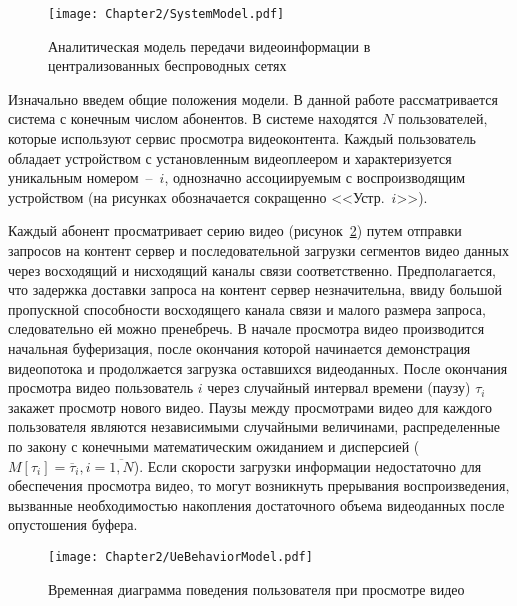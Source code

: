 \begin{figure}[htbp]
\begin{center}
\texttt{[image: Chapter2/SystemModel.pdf]}
\caption{Аналитическая модель передачи видеоинформации в централизованных беспроводных сетях}
\label{fig:SystemModel}
\end{center}
\end{figure}

Изначально введем общие положения модели. В данной работе рассматривается система с конечным числом абонентов. В системе находятся $N$ пользователей, которые используют сервис просмотра видеоконтента. Каждый пользователь обладает устройством с установленным видеоплеером и характеризуется уникальным номером~--~$i$, однозначно ассоциируемым с воспроизводящим устройством (на рисунках обозначается сокращенно <<Устр.~$i$>>).

Каждый абонент просматривает серию видео (рисунок~\ref{fig:UeBehaviorModel}) путем отправки запросов на контент сервер и последовательной загрузки сегментов видео данных через восходящий и нисходящий каналы связи соответственно. Предполагается, что задержка доставки запроса на контент сервер незначительна, ввиду большой пропускной способности восходящего канала связи и малого размера запроса, следовательно ей можно пренебречь. В начале просмотра видео производится начальная буферизация, после окончания которой начинается демонстрация видеопотока и продолжается загрузка оставшихся видеоданных. После окончания просмотра видео пользователь $i$ через случайный интервал времени (паузу) $\tau_i$ закажет просмотр нового видео. Паузы между просмотрами видео для каждого пользователя являются независимыми случайными величинами, распределенные по закону с конечными математическим ожиданием и дисперсией ($M[\tau_i] = \overline{\tau}_i, i=\overline{1,N}$). Если скорости загрузки информации недостаточно для обеспечения просмотра видео, то могут возникнуть прерывания воспроизведения, вызванные необходимостью накопления достаточного объема видеоданных после опустошения буфера.

\begin{figure}[htbp]
\begin{center}
\texttt{[image: Chapter2/UeBehaviorModel.pdf]}
\caption{Временная диаграмма поведения пользователя при просмотре видео}
\label{fig:UeBehaviorModel}
\end{center}
\end{figure}

